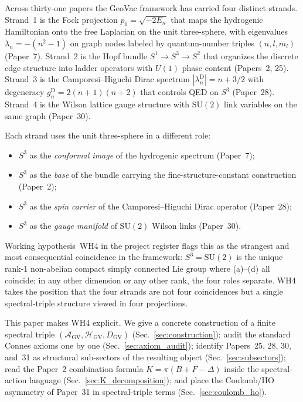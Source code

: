 \documentclass[11pt]{article}
\begin{document}
Across thirty-one papers the GeoVac framework has carried four
distinct strands.  Strand~1 is the Fock projection
$p_0 = \sqrt{-2E_n}$ that maps the hydrogenic Hamiltonian onto the
free Laplacian on the unit three-sphere, with eigenvalues
$\lambda_n = -(n^2 - 1)$ on graph nodes labeled by quantum-number
triples $(n, l, m_l)$ (Paper~7).  Strand~2 is the Hopf bundle
$S^1 \to S^3 \to S^2$ that organizes the discrete edge structure into
ladder operators with $U(1)$ phase content (Papers~2, 25).  Strand~3
is the Camporesi--Higuchi Dirac spectrum
$|\lambda_n^{\mathrm{D}}| = n + 3/2$ with degeneracy
$g_n^{\mathrm{D}} = 2(n+1)(n+2)$ that controls QED on $S^3$
(Paper~28).  Strand~4 is the Wilson lattice gauge structure with
$\mathrm{SU}(2)$ link variables on the same graph (Paper~30).

Each strand uses the unit three-sphere in a different role:
\begin{itemize}\setlength{\itemsep}{0pt}
\item[(a)] $S^3$ as the \emph{conformal image} of the hydrogenic
spectrum (Paper~7);
\item[(b)] $S^3$ as the \emph{base} of the bundle carrying the
fine-structure-constant construction (Paper~2);
\item[(c)] $S^3$ as the \emph{spin carrier} of the Camporesi--Higuchi
Dirac operator (Paper~28);
\item[(d)] $S^3$ as the \emph{gauge manifold} of $\mathrm{SU}(2)$
Wilson links (Paper~30).
\end{itemize}
Working hypothesis~WH4 in the project register flags this as the
strangest and most consequential coincidence in the framework: $S^3 =
\mathrm{SU}(2)$ is the unique rank-1 non-abelian compact simply
connected Lie group where (a)--(d) all coincide; in any other
dimension or any other rank, the four roles separate.  WH4 takes the
position that the four strands are not four coincidences but a single
spectral-triple structure viewed in four projections.

This paper makes WH4 explicit.  We give a concrete construction of a
finite spectral triple
$(\mathcal{A}_{\mathrm{GV}}, \mathcal{H}_{\mathrm{GV}},
D_{\mathrm{GV}})$ (Sec.~\ref{sec:construction}); audit the standard
Connes axioms one by one (Sec.~\ref{sec:axiom_audit}); identify
Papers~25, 28, 30, and~31 as structural sub-sectors of the resulting
object (Sec.~\ref{sec:subsectors}); read the Paper~2 combination
formula $K = \pi(B + F - \Delta)$ inside the spectral-action language
(Sec.~\ref{sec:K_decomposition}); and place the Coulomb/HO asymmetry
of Paper~31 in spectral-triple terms (Sec.~\ref{sec:coulomb_ho}).
\end{document}
